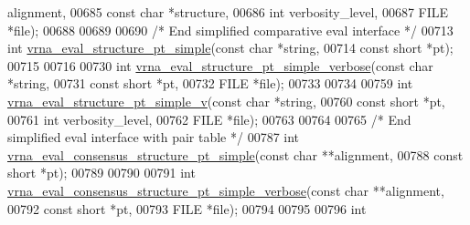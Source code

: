 \begin{DoxyCode}
      alignment,
00685                                                  \textcolor{keyword}{const} \textcolor{keywordtype}{char} *structure,
00686                                                  \textcolor{keywordtype}{int}        verbosity\_level,
00687                                                  FILE       *file);
00688 
00689 
00690 \textcolor{comment}{/* End simplified comparative eval interface */}
00713 \textcolor{keywordtype}{int} \mbox{\hyperlink{group__eval_ga0bba59b4d6e53461088666ff4aece7b0}{vrna\_eval\_structure\_pt\_simple}}(\textcolor{keyword}{const} \textcolor{keywordtype}{char}  *\textcolor{keywordtype}{string},
00714                                   \textcolor{keyword}{const} \textcolor{keywordtype}{short} *pt);
00715 
00716 
00730 \textcolor{keywordtype}{int} \mbox{\hyperlink{group__eval_ga76e152ee9a02be23da14cdddf52b4e44}{vrna\_eval\_structure\_pt\_simple\_verbose}}(\textcolor{keyword}{const} \textcolor{keywordtype}{char}  *\textcolor{keywordtype}{string},
00731                                           \textcolor{keyword}{const} \textcolor{keywordtype}{short} *pt,
00732                                           FILE        *file);
00733 
00734 
00759 \textcolor{keywordtype}{int} \mbox{\hyperlink{group__eval_gac40b813d35289da9816d0c1eec94faa5}{vrna\_eval\_structure\_pt\_simple\_v}}(\textcolor{keyword}{const} \textcolor{keywordtype}{char}  *\textcolor{keywordtype}{string},
00760                                     \textcolor{keyword}{const} \textcolor{keywordtype}{short} *pt,
00761                                     \textcolor{keywordtype}{int}         verbosity\_level,
00762                                     FILE        *file);
00763 
00764 
00765 \textcolor{comment}{/* End simplified eval interface with pair table */}
00787 \textcolor{keywordtype}{int} \mbox{\hyperlink{group__eval_gabbb4d2a7aa324ec9cce8f47ce61ab8af}{vrna\_eval\_consensus\_structure\_pt\_simple}}(\textcolor{keyword}{const} \textcolor{keywordtype}{char}  **alignment,
00788                                             \textcolor{keyword}{const} \textcolor{keywordtype}{short} *pt);
00789 
00790 
00791 \textcolor{keywordtype}{int} \mbox{\hyperlink{group__eval_ga2769e4369d023ad2d5c5f4d2ee825c23}{vrna\_eval\_consensus\_structure\_pt\_simple\_verbose}}(\textcolor{keyword}{const} \textcolor{keywordtype}{
      char}  **alignment,
00792                                                     \textcolor{keyword}{const} \textcolor{keywordtype}{short} *pt,
00793                                                     FILE        *file);
00794 
00795 
00796 \textcolor{keywordtype}{int}

\end{DoxyCode}
